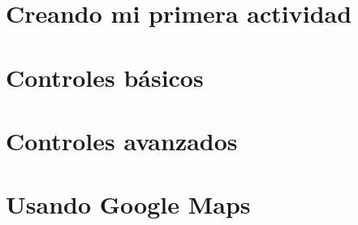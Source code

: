 \documentclass[letterpaper,12pt,dvips]{book}
\newcounter{ejemplo}
\begin{document}
\begin{mainmatter}
\chapter{Creando mi primera actividad}



\chapter{Controles básicos}


\chapter{Controles avanzados}\label{cap:ascendente}

%

\chapter{Usando Google Maps}


%




\end{mainmatter}

% 
\end{document}
